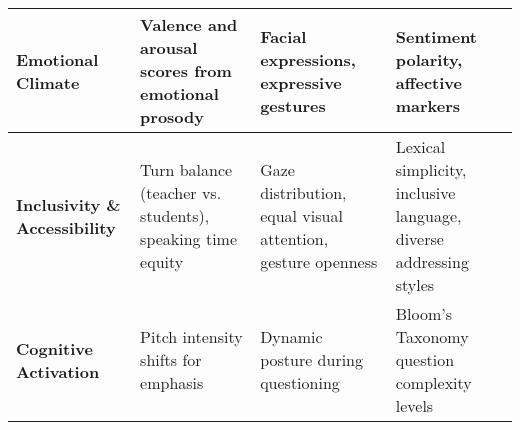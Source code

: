\begin{table*}[htbp]
\begin{tabular}{|p{3cm}|p{4.5cm}|p{4.5cm}|p{3.8cm}|}
\textbf{Emotional Climate} & 
Valence and arousal scores from emotional prosody \cite{dmello2012multimodal} & 
Facial expressions, expressive gestures \cite{mcneill1992hand, ochoa2016multimodal} & 
Sentiment polarity, affective markers \cite{dmello2012multimodal} \\
\hline

\textbf{Inclusivity \& Accessibility} & 
Turn balance (teacher vs. students), speaking time equity & 
Gaze distribution, equal visual attention, gesture openness \cite{fugate2010gaze} & 
Lexical simplicity, inclusive language, diverse addressing styles \cite{Steinberg2021, Heffernan2022} \\
\hline

\textbf{Cognitive Activation} & 
Pitch intensity shifts for emphasis & 
Dynamic posture during questioning & 
Bloom's Taxonomy question complexity levels \cite{graesser2005question, chi1989self} \\
\hline

\end{tabular}
\end{table*}
